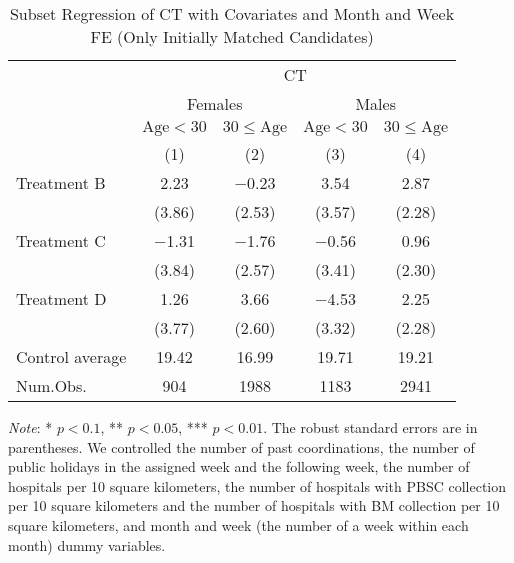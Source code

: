 \documentclass[12pt, a4paper]{article}
\begin{document}
\begin{table}[H]

\caption{\label{tab:lm-test-subset2-init}Subset Regression of CT with Covariates and Month and Week FE (Only Initially Matched Candidates)}
\centering
\fontsize{8}{10}\selectfont
\begin{threeparttable}
\begin{tabular}[t]{lcccc}
\toprule
\multicolumn{1}{c}{ } & \multicolumn{4}{c}{CT} \\
\cmidrule(l{3pt}r{3pt}){2-5}
\multicolumn{1}{c}{ } & \multicolumn{2}{c}{Females} & \multicolumn{2}{c}{Males} \\
\cmidrule(l{3pt}r{3pt}){2-3} \cmidrule(l{3pt}r{3pt}){4-5}
\multicolumn{1}{c}{ } & \multicolumn{1}{c}{$\text{Age} < 30$} & \multicolumn{1}{c}{$30 \le \text{Age}$} & \multicolumn{1}{c}{$\text{Age} < 30$} & \multicolumn{1}{c}{$30 \le \text{Age}$} \\
\cmidrule(l{3pt}r{3pt}){2-2} \cmidrule(l{3pt}r{3pt}){3-3} \cmidrule(l{3pt}r{3pt}){4-4} \cmidrule(l{3pt}r{3pt}){5-5}
  & (1) & (2) & (3) & (4)\\
\midrule
Treatment B & \num{2.23} & \num{-0.23} & \num{3.54} & \num{2.87}\\
 & (\num{3.86}) & (\num{2.53}) & (\num{3.57}) & (\num{2.28})\\
Treatment C & \num{-1.31} & \num{-1.76} & \num{-0.56} & \num{0.96}\\
 & (\num{3.84}) & (\num{2.57}) & (\num{3.41}) & (\num{2.30})\\
Treatment D & \num{1.26} & \num{3.66} & \num{-4.53} & \num{2.25}\\
 & (\num{3.77}) & (\num{2.60}) & (\num{3.32}) & (\num{2.28})\\
\midrule
Control average & 19.42 & 16.99 & 19.71 & 19.21\\
Num.Obs. & \num{904} & \num{1988} & \num{1183} & \num{2941}\\
\bottomrule
\end{tabular}
\begin{tablenotes}
\item \emph{Note}: * $p < 0.1$, ** $p < 0.05$, *** $p < 0.01$. The robust standard errors are in parentheses. We controlled the number of past coordinations, the number of public holidays in the assigned week and the following week, the number of hospitals per 10 square kilometers, the number of hospitals with PBSC collection per 10 square kilometers and the number of hospitals with BM collection per 10 square kilometers, and month and week (the number of a week within each month) dummy variables.
\end{tablenotes}
\end{threeparttable}
\end{table}
\end{document}
